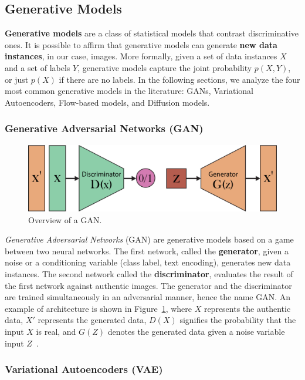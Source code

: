 \documentclass[preprint]{elsarticle}
\begin{document}
\subsection{Generative Models}\label{sec:imggenmodels}
\textbf{Generative models} are a class of statistical models that contrast discriminative ones. 
It is possible to affirm that generative models can generate \textbf{new data instances}, 
in our case, images. 
More formally, given a set of data instances $X$ and a set of labels $Y$, 
generative models capture the joint probability $p(X, Y)$, or just $p(X)$ if there are no labels. 
In the following sections, we  analyze the four most common generative models in the literature: GANs, Variational Autoencoders, Flow-based models, and Diffusion models.


\subsubsection{Generative Adversarial Networks (GAN)}\label{sec:gan}

\begin{figure}[b]
	\centering
    \includegraphics[scale=0.8]{img/svg/GAN.png}
	\caption{Overview of a GAN.}\label{fig:gan}
\end{figure}

\emph{Generative Adversarial Networks} (GAN) \cite{goodfellow2014generative} are generative models based on a game between two neural networks. 
The first network, called the \textbf{generator}, given a noise or a conditioning variable (class label, text encoding), generates new data instances. 
The second network called the \textbf{discriminator}, evaluates the result of the first network against authentic images.
The generator and the discriminator are trained simultaneously in an adversarial manner, hence the name GAN. An example of architecture is shown in Figure~\ref{fig:gan}, where $X$ represents the authentic data, $X'$ represents the generated data, $D(X)$ signifies the probability that the input $X$ is real, and $G(Z)$ denotes the generated data given a noise variable input $Z$~\cite{weng2019gan}.

\subsubsection{Variational Autoencoders (VAE)}\label{sec:vae}
\end{document}
